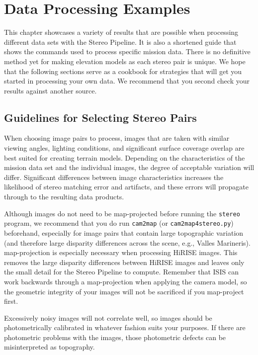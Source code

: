 \chapter{Data Processing Examples}
\label{ch:examples}


This chapter showcases a variety of results that are possible when
processing different data sets with the Stereo Pipeline. It is also a
shortened guide that shows the commands used to process specific
mission data. There is no definitive method yet for making elevation
models as each stereo pair is unique. We hope that the following
sections serve as a cookbook for strategies that will get you started
in processing your own data. We recommend that you second check your
results against another source.

\section{Guidelines for Selecting Stereo Pairs}

When choosing image pairs to process, images that are taken with
similar viewing angles, lighting conditions, and significant surface
coverage overlap are best suited for creating terrain
models. Depending on the characteristics of the mission data set and
the individual images, the degree of acceptable variation will
differ. Significant differences between image characteristics
increases the likelihood of stereo matching error and artifacts, and
these errors will propagate through to the resulting data products.

Although images do not need to be map-projected before running the
\texttt{stereo} program, we recommend that you do run {\tt cam2map}
(or \texttt{cam2map4stereo.py})
beforehand, especially for image pairs that contain large topographic
variation (and therefore large disparity differences across the
scene, e.g., Valles Marineris).  map-projection is especially necessary
when processing \ac{HiRISE} images. This removes the large disparity
differences between \ac{HiRISE} images and leaves only the small
detail for the Stereo Pipeline to compute. Remember that \ac{ISIS}
can work backwards through a map-projection when applying the camera
model, so the geometric integrity of your images will not be sacrificed
if you map-project first.

Excessively noisy images will not correlate well, so images should be
photometrically calibrated in whatever fashion suits your purposes. If
there are photometric problems with the images, those photometric
defects can be misinterpreted as topography.

